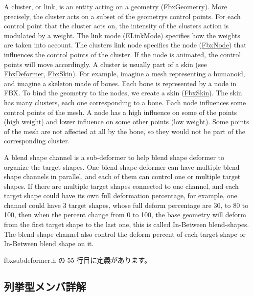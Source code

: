 A cluster, or link, is an entity acting on a geometry (\hyperlink{class_fbx_geometry}{Fbx\+Geometry}). More precisely, the cluster acts on a subset of the geometry\textquotesingle{}s control points. For each control point that the cluster acts on, the intensity of the cluster\textquotesingle{}s action is modulated by a weight. The link mode (E\+Link\+Mode) specifies how the weights are taken into account. The cluster\textquotesingle{}s link node specifies the node (\hyperlink{class_fbx_node}{Fbx\+Node}) that influences the control points of the cluster. If the node is animated, the control points will move accordingly. A cluster is usually part of a skin (see \hyperlink{class_fbx_deformer}{Fbx\+Deformer}, \hyperlink{class_fbx_skin}{Fbx\+Skin}). For example, imagine a mesh representing a humanoid, and imagine a skeleton made of bones. Each bone is represented by a node in F\+BX. To bind the geometry to the nodes, we create a skin (\hyperlink{class_fbx_skin}{Fbx\+Skin}). The skin has many clusters, each one corresponding to a bone. Each node influences some control points of the mesh. A node has a high influence on some of the points (high weight) and lower influence on some other points (low weight). Some points of the mesh are not affected at all by the bone, so they would not be part of the corresponding cluster.

A blend shape channel is a sub-\/deformer to help blend shape deformer to organize the target shapes. One blend shape deformer can have multiple blend shape channels in parallel, and each of them can control one or multiple target shapes. If there are multiple target shapes connected to one channel, and each target shape could have its own full deformation percentage, for example, one channel could have 3 target shapes, whose full deform percentage are 30, to 80 to 100, then when the percent change from 0 to 100, the base geometry will deform from the first target shape to the last one, this is called In-\/\+Between blend-\/shapes. The blend shape channel also control the deform percent of each target shape or In-\/\+Between blend shape on it. 

 fbxsubdeformer.\+h の 55 行目に定義があります。



\subsection{列挙型メンバ詳解}
\mbox{\label{class_fbx_sub_deformer_aed7eba8aabbb8b25a8ddbab127d67319}} 
